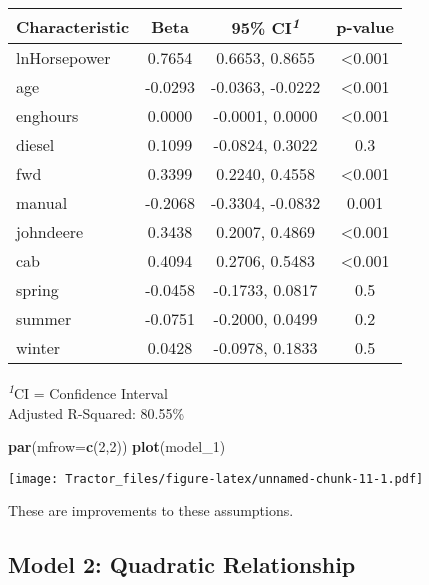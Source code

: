\documentclass[
]{article}
\newenvironment{Shaded}{\begin{snugshade}}{\end{snugshade}}
\newcommand{\AttributeTok}[1]{\textcolor[rgb]{0.13,0.29,0.53}{#1}}
\newcommand{\DecValTok}[1]{\textcolor[rgb]{0.00,0.00,0.81}{#1}}
\newcommand{\FunctionTok}[1]{\textcolor[rgb]{0.13,0.29,0.53}{\textbf{#1}}}
\newcommand{\NormalTok}[1]{#1}
\begin{document}
\begingroup
\fontsize{12.0pt}{14.4pt}\selectfont
\setlength{\LTpost}{0mm}
\begin{longtable}{lccc}
\toprule
\textbf{Characteristic} & \textbf{Beta} & \textbf{95\% CI}\textsuperscript{\textit{1}} & \textbf{p-value} \\ 
\midrule\addlinespace[2.5pt]
lnHorsepower & 0.7654 & 0.6653, 0.8655 & <0.001 \\ 
age & -0.0293 & -0.0363, -0.0222 & <0.001 \\ 
enghours & 0.0000 & -0.0001, 0.0000 & <0.001 \\ 
diesel & 0.1099 & -0.0824, 0.3022 & 0.3 \\ 
fwd & 0.3399 & 0.2240, 0.4558 & <0.001 \\ 
manual & -0.2068 & -0.3304, -0.0832 & 0.001 \\ 
johndeere & 0.3438 & 0.2007, 0.4869 & <0.001 \\ 
cab & 0.4094 & 0.2706, 0.5483 & <0.001 \\ 
spring & -0.0458 & -0.1733, 0.0817 & 0.5 \\ 
summer & -0.0751 & -0.2000, 0.0499 & 0.2 \\ 
winter & 0.0428 & -0.0978, 0.1833 & 0.5 \\ 
\bottomrule
\end{longtable}
\begin{minipage}{\linewidth}
\textsuperscript{\textit{1}}CI = Confidence Interval\\
Adjusted R-Squared: 80.55\%\\
\end{minipage}
\endgroup

\begin{Shaded}
\begin{Highlighting}[]
\FunctionTok{par}\NormalTok{(}\AttributeTok{mfrow=}\FunctionTok{c}\NormalTok{(}\DecValTok{2}\NormalTok{,}\DecValTok{2}\NormalTok{))}
\FunctionTok{plot}\NormalTok{(model\_1)}
\end{Highlighting}
\end{Shaded}

\texttt{[image: Tractor\_files/figure-latex/unnamed-chunk-11-1.pdf]}

These are improvements to these assumptions.

\subsection{Model 2: Quadratic
Relationship}\label{model-2-quadratic-relationship}
\end{document}
